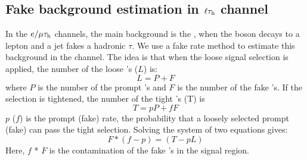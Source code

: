 \subsection{\texorpdfstring{Fake background estimation in $\ell\tau_{\rm h}$ channel}{Fake background estimation in lepton-tau channel}}
\label{sect:bkgFake}
In the $e/\mu\tau_{\rm h}$ channels, the main background is the \wjets, when the \Wpm boson decays to a lepton and a jet fakes a hadronic $\tau$.
We use a fake rate method to estimate this background \cite{CMS_AN_2010-261} in the \muTau channel.
The idea is that when the loose signal selection is applied, the number of the loose \Tau's ($L$) is:
\begin{equation}
L = P + F
\end{equation}
where $P$ is the number of the  prompt \Tau's and $F$ is the number of the  fake \Tau's. If the selection is tightened, the number of the tight \Tau's (T) is
\begin{equation}
 T = pP + fF
\end{equation} 
$p$ ($f$) is the prompt (fake) rate, the probability that a loosely selected prompt (fake) \Tau can pass the  tight  selection. 
Solving the system of two equations gives:
\begin{equation}
   F * (f - p) = (T - pL)
\label{eq:F}
\end{equation}
Here, $f$ * $F$ is the contamination of the fake \Tau's in the signal region. 

